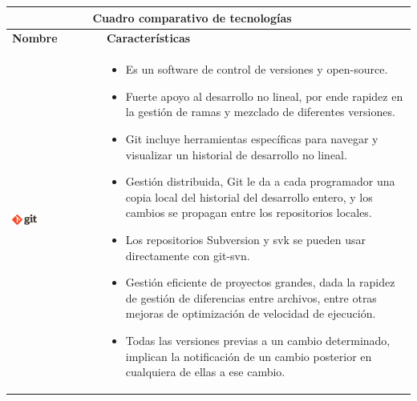 \begin{table}[b!]
    \centering
    \vspace{-30mm}
      \begin{tabular}{|p{2cm}|ll}
        \hline
        
        \multicolumn{2}{|c|}{{\bf Cuadro comparativo de tecnologías}} \\ 
        \hline
          \multicolumn{1}{|p{4cm}|}{{\bf Nombre}} & 
		  \multicolumn{1}{p{10cm}|}{{\bf Características}}\\

        \hline
          \multicolumn{1}{|p{5cm}|}{\includegraphics[width=0.3\textwidth]{images/git}} & 
          \multicolumn{2}{p{10cm}|}{\begin{itemize}
          \vspace{-17mm}
        \item Es un software de control de versiones y open-source.
        \item Fuerte apoyo al desarrollo no lineal, por ende rapidez en la gestión de ramas y mezclado de diferentes versiones. 
        \item Git incluye herramientas específicas para navegar y visualizar un historial de desarrollo no lineal.
        \item Gestión distribuida, Git le da a cada programador una copia local del historial del desarrollo entero, y los cambios se propagan entre los repositorios locales.
         \item Los repositorios Subversion y svk se pueden usar directamente con git-svn.
        \item Gestión eficiente de proyectos grandes, dada la rapidez de gestión de diferencias entre archivos, entre otras mejoras de optimización de velocidad de ejecución.
        \item Todas las versiones previas a un cambio determinado, implican la notificación de un cambio posterior en cualquiera de ellas a ese cambio.
       
      \end{itemize}} \\
         

\end{tabular}
\end{table}
